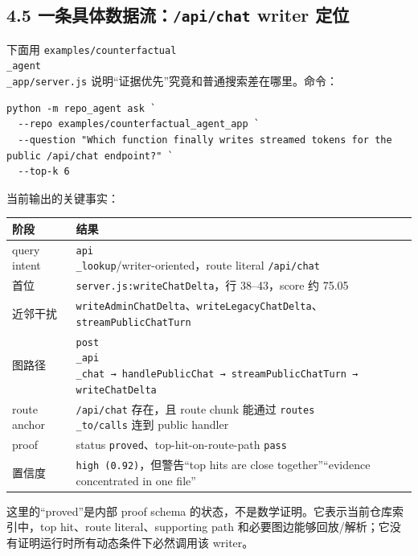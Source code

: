 \documentclass[UTF8,12pt,openany]{ctexbook}
\begin{document}
\subsection{4.5 一条具体数据流：\texttt{/api/chat} writer 定位}

下面用 \texttt{examples/counterfactual\\_agent\\_app/server.js} 说明“证据优先”究竟和普通搜索差在哪里。命令：\par

\begin{lstlisting}
python -m repo_agent ask `
  --repo examples/counterfactual_agent_app `
  --question "Which function finally writes streamed tokens for the public /api/chat endpoint?" `
  --top-k 6
\end{lstlisting}

当前输出的关键事实：\par

\begin{center}
\small
\begin{longtable}{|p{}|p{}|}
\toprule
阶段 & 结果 \\
\midrule
query intent & \texttt{api\\_lookup}/writer-oriented，route literal \texttt{/api/chat} \\
首位 & \texttt{server.js:writeChatDelta}，行 38–43，score 约 75.05 \\
近邻干扰 & \texttt{writeAdminChatDelta}、\texttt{writeLegacyChatDelta}、\texttt{streamPublicChatTurn} \\
图路径 & \texttt{post\\_api\\_chat → handlePublicChat → streamPublicChatTurn → writeChatDelta} \\
route anchor & \texttt{/api/chat} 存在，且 route chunk 能通过 \texttt{routes\\_to/calls} 连到 public handler \\
proof & status \texttt{proved}、top-hit-on-route-path \texttt{pass} \\
置信度 & \texttt{high (0.92)}，但警告“top hits are close together”“evidence concentrated in one file” \\
\bottomrule
\end{longtable}
\end{center}

这里的“proved”是内部 proof schema 的状态，不是数学证明。它表示当前仓库索引中，top hit、route literal、supporting path 和必要图边能够回放/解析；它没有证明运行时所有动态条件下必然调用该 writer。\par
\end{document}
